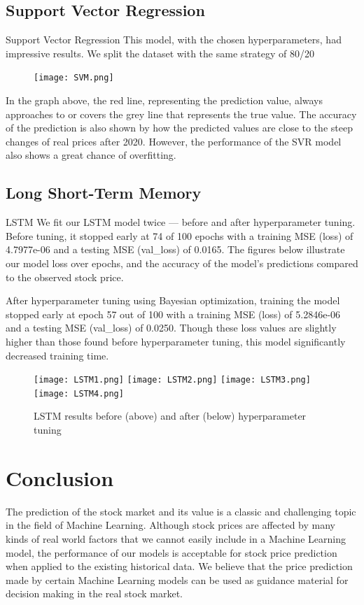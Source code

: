 \documentclass[12pt,a4paper]{article}
\begin{document}
\subsection{Support Vector Regression}
Support Vector Regression
This model, with the chosen hyperparameters, had impressive results. We split the dataset with the same strategy of 80/20%

\begin{figure}[h]
\centering
\texttt{[image: SVM.png]}
\end{figure}

In the graph above, the red line, representing the prediction value, always approaches to or covers the grey line that represents the true value. The accuracy of the prediction is also shown by how the predicted values are close to the steep changes of real prices after 2020. However, the performance of the SVR model also shows a great chance of overfitting.

\subsection{Long Short-Term Memory}

LSTM
We fit our LSTM model twice — before and after hyperparameter tuning. Before tuning, it stopped early at 74 of 100 epochs with a training MSE (loss) of 4.7977e-06 and a testing MSE (val_loss) of 0.0165. The figures below illustrate our model loss over epochs, and the accuracy of the model’s predictions compared to the observed stock price.

After hyperparameter tuning using Bayesian optimization, training the model stopped early at epoch 57 out of 100 with a training MSE (loss) of 5.2846e-06 and a testing MSE (val_loss) of 0.0250. Though these loss values are slightly higher than those found before hyperparameter tuning, this model significantly decreased training time.

\begin{figure}[h]
\centering
\texttt{[image: LSTM1.png]}
\texttt{[image: LSTM2.png]}
\texttt{[image: LSTM3.png]}
\texttt{[image: LSTM4.png]}
\caption{LSTM results before (above) and after (below) hyperparameter tuning}
\end{figure}


\section{Conclusion}
The prediction of the stock market and its value is a classic and challenging topic in the field of Machine Learning. Although stock prices are affected by many kinds of real world factors that we cannot easily include in a Machine Learning model, the performance of our models is acceptable for stock price prediction when applied to the existing historical data. We believe that the price prediction made by certain Machine Learning models can be used as guidance material for decision making in the real stock market. 
\end{document}
